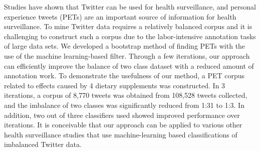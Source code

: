 Studies have shown that Twitter can be used for health surveillance, and personal experience tweets (PETs) are an important source of information for health surveillance. To mine Twitter data requires a relatively balanced corpus and it is challenging to construct such a corpus due to the labor-intensive annotation tasks of large data sets. We developed a bootstrap method of finding PETs with the use of the machine learning-based filter. Through a few iterations, our approach can efficiently improve the balance of two class dataset with a reduced amount of annotation work. To demonstrate the usefulness of our method, a PET corpus related to effects caused by 4 dietary supplements was constructed. In 3 iterations, a corpus of 8,770 tweets was obtained from 108,528 tweets collected, and the imbalance of two classes was significantly reduced from 1:31 to 1:3. In addition, two out of three classifiers used showed improved performance over iterations. It is conceivable that our approach can be applied to various other health surveillance studies that use machine-learning based classifications of imbalanced Twitter data.
